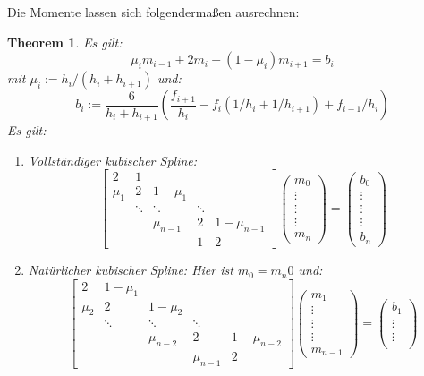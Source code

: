\documentclass[10pt,a4paper]{article}
\newtheorem{theorem}{Theorem}
\begin{document}
	Die Momente lassen sich folgendermaßen ausrechnen:
	\begin{theorem}
		Es gilt:
		$$\mu_i m_{i-1} + 2m_i + (1-\mu_i)m_{i+1} = b_i$$
		mit $\mu_i := h_i/(h_i+h_{i+1})$ und:
		$$b_i := \frac{6}{h_i+h_{i+1}}(\frac{f_{i+1}}{h_i} -f_i (1/h_i + 1/h_{i+1})+ f_{i-1}/h_i)$$
		Es gilt: 
		\begin{enumerate}
			\item Vollständiger kubischer Spline:
			$$\begin{bmatrix}
				2 & 1 & & & \\
				\mu_1 & 2 & 1-\mu_1 & & \\
				& \ddots& \ddots &\ddots &  \\
				& & \mu_{n-1} & 2 & 1-\mu_{n-1} \\
				& & & 1 & 2
			\end{bmatrix} \begin{pmatrix}
				m_0\\
				\vdots\\
				\vdots\\
				\vdots \\
				m_n
			\end{pmatrix} =  \begin{pmatrix}
				b_0\\
				\vdots\\
				\vdots\\
				\vdots \\
				b_n
			\end{pmatrix}$$
		\item Natürlicher kubischer Spline: Hier ist $m_0=m_n0$ und:
		$$\begin{bmatrix}
			2 & 1-\mu_1 & & & \\
			\mu_2 & 2 & 1-\mu_2 & & \\
			& \ddots& \ddots &\ddots &  \\
			& & \mu_{n-2} & 2 & 1-\mu_{n-2} \\
			& & & \mu_{n-1} & 2
		\end{bmatrix} \begin{pmatrix}
			m_1\\
			\vdots\\
			\vdots\\
			\vdots \\
			m_{n-1}
		\end{pmatrix} =  \begin{pmatrix}
			b_1\\
			\vdots\\
			\vdots\\

\end{pmatrix}$$
\end{enumerate}
\end{theorem}
\end{document}
